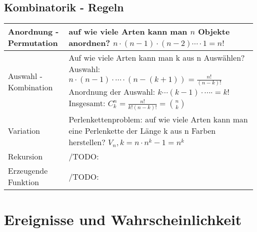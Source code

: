 \documentclass[margin=normal]{tex/hsrzf}
\begin{document}
\subsection{Kombinatorik - Regeln}
\begin{tabular}{|l| p{10cm}|}
    \hline Anordnung - Permutation &
    auf wie viele Arten kann man $n$ Objekte anordnen? \newline
    $ n \cdot (n-1) \cdot (n-2) \cdots \cdot 1 = n! $         \\
    \hline Auswahl - Kombination   &
    Auf wie viele Arten kann man k aus n Auswählen? \newline
    Auswahl: $ n \cdot (n-1) \cdot \cdots \cdot (n-(k+1)) = \frac{n!}{(n-k)!}$
    Anordnung der Auswahl:  $k \cdots (k-1) \cdot \cdots \cdot = k!$
    Insgesamt: $ C^n_k = \frac{n!}{k!(n-k)!} = \binom{n}{k} $ \\
    \hline Variation               &
    Perlenkettenproblem:
    auf wie viele Arten kann man eine Perlenkette der Länge k aus n Farben herstellen? \newline
    $V_n,k = n \cdot n^k-1 = n^k$                             \\
    \hline Rekursion               & /TODO:
    \\
    \hline Erzeugende Funktion     & /TODO:
    \\
    \hline
\end{tabular}

\section{Ereignisse und Wahrscheinlichkeit}
\end{document}
